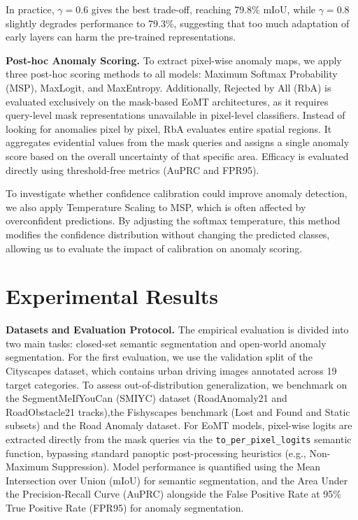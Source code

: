 \documentclass[10pt,twocolumn,letterpaper]{article}
\begin{document}
In practice, $\gamma = 0.6$ gives the best trade-off, reaching 79.8\% mIoU, while $\gamma = 0.8$ slightly degrades performance to 79.3\%, suggesting that too much adaptation of early layers can harm the pre-trained representations. 

\textbf{Post-hoc Anomaly Scoring.}
To extract pixel-wise anomaly maps, we apply three post-hoc scoring methods to all models: Maximum Softmax Probability (MSP), MaxLogit, and MaxEntropy. Additionally, Rejected by All (RbA) is evaluated exclusively on the mask-based EoMT architectures, as it requires query-level mask representations unavailable in pixel-level classifiers. Instead of looking for anomalies pixel by pixel, RbA evaluates entire spatial regions. It aggregates evidential values from the mask queries and assigns a single anomaly score based on the overall uncertainty of that specific area. Efficacy is evaluated directly using threshold-free metrics (AuPRC and FPR95).

To investigate whether confidence calibration could improve anomaly detection, we also apply Temperature Scaling to MSP, which is often affected by overconfident predictions. By adjusting the softmax temperature, this method modifies the confidence distribution without changing the predicted classes, allowing us to evaluate the impact of calibration on anomaly scoring.

\section{Experimental Results}

\textbf{Datasets and Evaluation Protocol.}
The empirical evaluation is divided into two main tasks: closed-set semantic segmentation and open-world anomaly segmentation. For the first evaluation, we use the validation split of the Cityscapes dataset, which contains urban driving images annotated across 19 target categories. To assess out-of-distribution generalization, we benchmark on the SegmentMeIfYouCan (SMIYC) dataset (RoadAnomaly21 and RoadObstacle21 tracks),the Fishyscapes benchmark (Lost and Found and Static subsets) and the Road Anomaly dataset. For EoMT models, pixel-wise logits are extracted directly from the mask queries via the \texttt{to\_per\_pixel\_logits} semantic function, bypassing standard panoptic post-processing heuristics (e.g., Non-Maximum Suppression). Model performance is quantified using the Mean Intersection over Union (mIoU) for semantic segmentation, and the Area Under the Precision-Recall Curve (AuPRC) alongside the False Positive Rate at 95\% True Positive Rate (FPR95) for anomaly segmentation.
\end{document}
